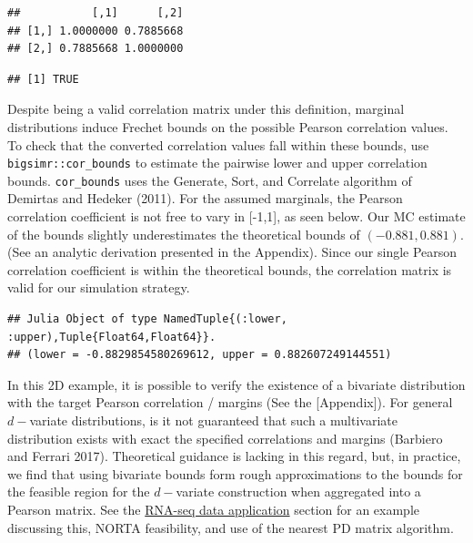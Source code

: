 \documentclass{article}
\newenvironment{Shaded}{\begin{snugshade}}{\end{snugshade}}
\newcommand{\AttributeTok}[1]{\textcolor[rgb]{0.77,0.63,0.00}{#1}}
\newcommand{\CommentTok}[1]{\textcolor[rgb]{0.56,0.35,0.01}{\textit{#1}}}
\newcommand{\DecValTok}[1]{\textcolor[rgb]{0.00,0.00,0.81}{#1}}
\newcommand{\FloatTok}[1]{\textcolor[rgb]{0.00,0.00,0.81}{#1}}
\newcommand{\FunctionTok}[1]{\textcolor[rgb]{0.00,0.00,0.00}{#1}}
\newcommand{\NormalTok}[1]{#1}
\newcommand{\SpecialCharTok}[1]{\textcolor[rgb]{0.00,0.00,0.00}{#1}}
\begin{document}
\begin{verbatim}
##           [,1]      [,2]
## [1,] 1.0000000 0.7885668
## [2,] 0.7885668 1.0000000
\end{verbatim}

\begin{Shaded}
\end{Shaded}

\begin{verbatim}
## [1] TRUE
\end{verbatim}

Despite being a valid correlation matrix under this definition, marginal
distributions induce Frechet bounds on the possible Pearson correlation
values. To check that the converted correlation values fall within these
bounds, use \texttt{bigsimr::cor\_bounds} to estimate the pairwise lower
and upper correlation bounds. \texttt{cor\_bounds} uses the Generate,
Sort, and Correlate algorithm of Demirtas and Hedeker (2011). For the
assumed marginals, the Pearson correlation coefficient is not free to
vary in {[}-1,1{]}, as seen below. Our MC estimate of the bounds
slightly underestimates the theoretical bounds of \((-0.881, 0.881)\).
(See an analytic derivation presented in the Appendix). Since our single
Pearson correlation coefficient is within the theoretical bounds, the
correlation matrix is valid for our simulation strategy.

\begin{Shaded}
\end{Shaded}

\begin{verbatim}
## Julia Object of type NamedTuple{(:lower, :upper),Tuple{Float64,Float64}}.
## (lower = -0.8829854580269612, upper = 0.882607249144551)
\end{verbatim}

In this 2D example, it is possible to verify the existence of a
bivariate distribution with the target Pearson correlation / margins
(See the {[}Appendix{]}). For general \(d-\)variate distributions, is it
not guaranteed that such a multivariate distribution exists with exact
the specified correlations and margins (Barbiero and Ferrari 2017).
Theoretical guidance is lacking in this regard, but, in practice, we
find that using bivariate bounds form rough approximations to the bounds
for the feasible region for the \(d-\)variate construction when
aggregated into a Pearson matrix. See the
\protect\hyperlink{examples}{RNA-seq data application} section for an
example discussing this, NORTA feasibility, and use of the nearest PD
matrix algorithm.
\end{document}
